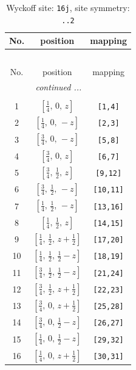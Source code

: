 \documentclass[fleqn,8pt]{jsarticle}
\begin{document}
\begin{longtable}{ccc}
\caption{Wyckoff site: {\tt 16j}, site symmetry: {\tt ..2}}
 \\
 \hline \hline
No. & position & mapping \\ \hline \endfirsthead

\multicolumn{2}{l}{\tablename\ \thetable{}} \\
 \hline \hline
No. & position & mapping \\ \hline \endhead

 \hline \hline
\multicolumn{2}{r}{\footnotesize\it continued ...} \\ \endfoot

 \hline \hline
\multicolumn{2}{r}{} \\ \endlastfoot

1 & $\left[ \frac{1}{4},\, 0,\, z \right]$ & {\tt [1,4]} \\ \hline
2 & $\left[ \frac{1}{4},\, 0,\, - z \right]$ & {\tt [2,3]} \\ \hline
3 & $\left[ \frac{3}{4},\, 0,\, - z \right]$ & {\tt [5,8]} \\ \hline
4 & $\left[ \frac{3}{4},\, 0,\, z \right]$ & {\tt [6,7]} \\ \hline
5 & $\left[ \frac{3}{4},\, \frac{1}{2},\, z \right]$ & {\tt [9,12]} \\ \hline
6 & $\left[ \frac{3}{4},\, \frac{1}{2},\, - z \right]$ & {\tt [10,11]} \\ \hline
7 & $\left[ \frac{1}{4},\, \frac{1}{2},\, - z \right]$ & {\tt [13,16]} \\ \hline
8 & $\left[ \frac{1}{4},\, \frac{1}{2},\, z \right]$ & {\tt [14,15]} \\ \hline
9 & $\left[ \frac{1}{4},\, \frac{1}{2},\, z + \frac{1}{2} \right]$ & {\tt [17,20]} \\ \hline
10 & $\left[ \frac{1}{4},\, \frac{1}{2},\, \frac{1}{2} - z \right]$ & {\tt [18,19]} \\ \hline
11 & $\left[ \frac{3}{4},\, \frac{1}{2},\, \frac{1}{2} - z \right]$ & {\tt [21,24]} \\ \hline
12 & $\left[ \frac{3}{4},\, \frac{1}{2},\, z + \frac{1}{2} \right]$ & {\tt [22,23]} \\ \hline
13 & $\left[ \frac{3}{4},\, 0,\, z + \frac{1}{2} \right]$ & {\tt [25,28]} \\ \hline
14 & $\left[ \frac{3}{4},\, 0,\, \frac{1}{2} - z \right]$ & {\tt [26,27]} \\ \hline
15 & $\left[ \frac{1}{4},\, 0,\, \frac{1}{2} - z \right]$ & {\tt [29,32]} \\ \hline
16 & $\left[ \frac{1}{4},\, 0,\, z + \frac{1}{2} \right]$ & {\tt [30,31]} \\
\end{longtable}
\end{document}
